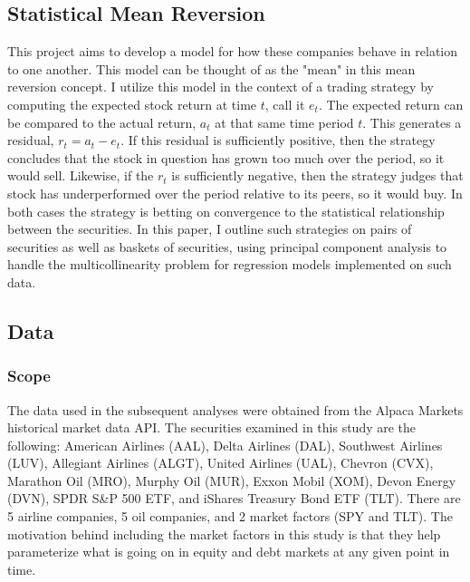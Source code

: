 \documentclass{article}
\begin{document}
\subsection{Statistical Mean Reversion}
This project aims to develop a model for how these companies behave in relation
to one another. This model can be thought of as the "mean" in this mean reversion concept. I
utilize this model in the context of a trading strategy by computing the expected stock return 
at time $t$, call it $e_t$. The expected return can be compared to the actual return, $a_t$
at that same time period $t$. This generates a residual, $r_t = a_t - e_t$. If this residual
is sufficiently positive, then the strategy concludes that the stock in question has grown too 
much over the period, so it would sell. Likewise, if the $r_t$ is sufficiently negative, then the 
strategy judges that stock has underperformed over the period relative to its peers, so it would buy. In both cases
the strategy is betting on convergence to the statistical relationship between the securities.
In this paper, I outline such strategies on pairs of securities as well as baskets of securities,
using principal component analysis to handle the multicollinearity problem for regression
models implemented on such data.

\subsection{Data}
\subsubsection{Scope}
The data used in the subsequent analyses were obtained from the Alpaca Markets historical 
market data API. The securities examined in this study are the following: American Airlines
(AAL), Delta Airlines (DAL), Southwest Airlines (LUV), Allegiant Airlines (ALGT), United
Airlines (UAL), Chevron (CVX), Marathon Oil (MRO), Murphy Oil (MUR), Exxon Mobil (XOM),
Devon Energy (DVN), SPDR S\&P 500 ETF, and iShares Treasury Bond ETF (TLT). There 
are 5 airline companies, 5 oil companies, and 2 market factors (SPY and TLT). The motivation
behind including the market factors in this study is that they help parameterize what is going
on in equity and debt markets at any given point in time.
\end{document}
